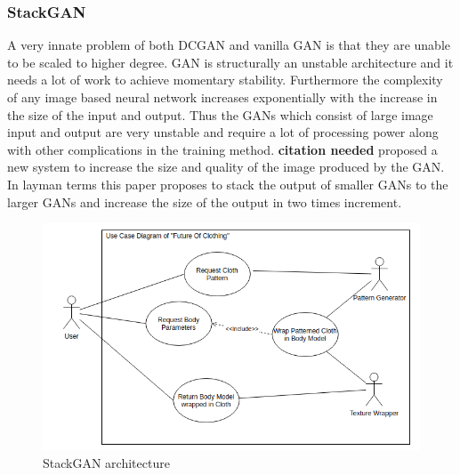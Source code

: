 \documentclass{article}
\begin{document}
\subsubsection{StackGAN}
A very innate problem of both DCGAN and vanilla GAN is that they are unable to be scaled to higher degree. GAN is structurally an unstable architecture and it needs a lot of work to achieve momentary stability. Furthermore the complexity of any image based neural network increases exponentially with the increase in the size of the input and output. Thus the GANs which consist of large image input and output are very unstable and require a lot of processing power along with other complications in the training method. \cite{zhang} \textbf{citation needed} proposed a new system to increase the size and quality of the image produced by the GAN. In layman terms this paper proposes to stack the output of smaller GANs to the larger GANs and increase the size of the output in two times increment.
\begin{figure}[h]
    \includegraphics[scale=0.5]{images/softwareDiagrams/FinalSystemUseCase.png}
    \centering
    \caption{StackGAN architecture}    
\end{figure}
\end{document}

